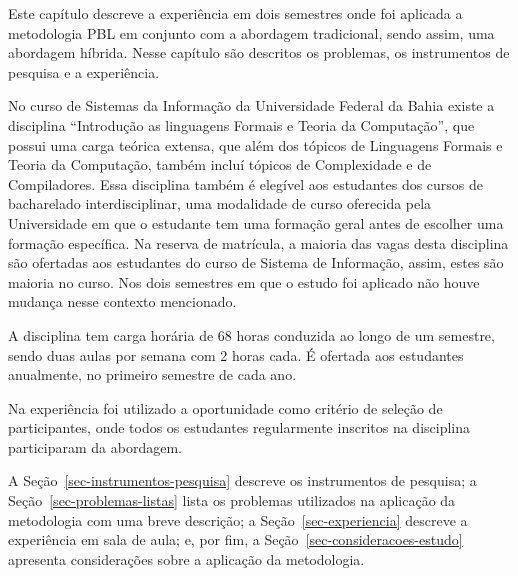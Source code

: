
\label{cap-estudo}
\acresetall
Este capítulo descreve a experiência em dois semestres onde foi aplicada a metodologia PBL
em conjunto com a abordagem tradicional, sendo assim, uma abordagem híbrida.
Nesse capítulo são descritos os problemas, os instrumentos de pesquisa e a
experiência.

No curso de Sistemas da Informação da Universidade Federal da Bahia existe
a disciplina ``Introdução as linguagens Formais e Teoria da Computação'',
que possui uma carga teórica extensa, que além dos tópicos de Linguagens Formais e Teoria
da Computação, também incluí tópicos de Complexidade e de Compiladores.
Essa disciplina também é elegível aos estudantes dos cursos de bacharelado
interdisciplinar, uma modalidade de curso oferecida pela Universidade
em que o estudante tem uma formação geral antes de escolher
uma formação específica.
Na reserva de matrícula, a maioria das vagas desta disciplina são ofertadas aos
estudantes do curso de Sistema de Informação, assim, estes são maioria no curso.
Nos dois semestres em que o estudo foi aplicado não houve mudança nesse
contexto mencionado.

A disciplina tem carga horária de 68 horas conduzida ao longo de um semestre, sendo duas
aulas por semana com 2 horas cada.
É ofertada aos estudantes anualmente, no primeiro semestre de cada ano.

Na experiência foi utilizado a oportunidade como critério de seleção de participantes, onde todos os
estudantes regularmente inscritos na disciplina participaram da abordagem.

A Seção~\ref{sec-instrumentos-pesquisa} descreve os instrumentos de pesquisa;
a Seção~\ref{sec-problemas-listas} lista os problemas utilizados
na aplicação da metodologia com uma breve
descrição;
a Seção~\ref{sec-experiencia} descreve a experiência em sala de aula;
e, por fim, a Seção~\ref{sec-consideracoes-estudo} apresenta
considerações sobre a aplicação da metodologia.





